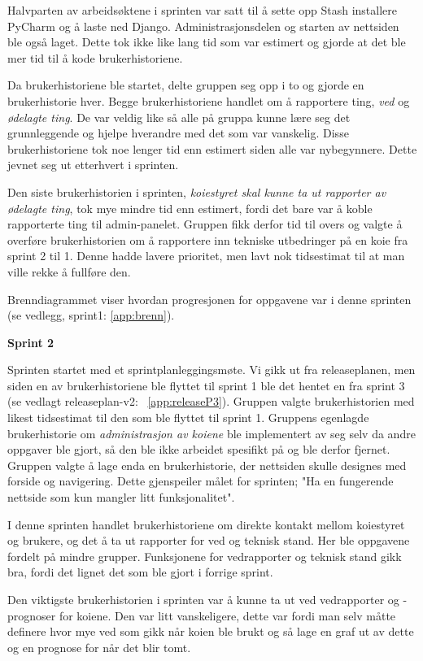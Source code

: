 \documentclass[12pt,a4paper,norsk]{article}
\begin{document}
Halvparten av arbeidsøktene i sprinten var satt til å sette opp Stash installere PyCharm og å laste ned Django. Administrasjonsdelen og starten av nettsiden ble også laget. Dette tok ikke like lang tid som var estimert og gjorde at det ble mer tid til å kode brukerhistoriene.

Da brukerhistoriene ble startet, delte gruppen seg opp i to og gjorde en brukerhistorie hver. Begge brukerhistoriene handlet om å rapportere ting, \textit{ved} og \textit{ødelagte ting}. De var veldig like så alle på gruppa kunne lære seg det grunnleggende og hjelpe hverandre med det som var vanskelig.  Disse brukerhistoriene tok noe lenger tid enn estimert siden alle var nybegynnere. Dette jevnet seg ut etterhvert i sprinten.

Den siste brukerhistorien i sprinten, \textit{koiestyret skal kunne ta ut rapporter av ødelagte ting}, tok mye mindre tid enn estimert, fordi det bare var å koble rapporterte ting til admin-panelet. Gruppen fikk derfor tid til overs og valgte å overføre brukerhistorien om å rapportere inn tekniske utbedringer på en koie fra sprint 2 til 1. Denne hadde lavere prioritet, men lavt nok tidsestimat til at man ville rekke å fullføre den.

Brenndiagrammet viser hvordan progresjonen for oppgavene var i denne sprinten (se vedlegg, sprint1: \cref{app:brenn}).

\bigskip \noindent \textbf{Sprint 2}
\par Sprinten startet med et sprintplanleggingsmøte. Vi gikk ut fra releaseplanen, men siden en av brukerhistoriene ble flyttet til sprint 1 ble det hentet en fra sprint 3 (se vedlagt releaseplan-v2: ~\cref{app:releaseP3}). Gruppen valgte brukerhistorien med likest tidsestimat til den som ble flyttet til sprint 1. Gruppens egenlagde brukerhistorie om \textit{administrasjon av koiene} ble implementert av seg selv da andre oppgaver ble gjort, så den ble ikke arbeidet spesifikt på og ble derfor fjernet. Gruppen valgte å lage enda en brukerhistorie, der nettsiden skulle designes med forside og navigering. Dette gjenspeiler målet for sprinten; "Ha en fungerende nettside som kun mangler litt funksjonalitet".

I denne sprinten handlet brukerhistoriene om direkte kontakt mellom koiestyret og brukere, og det å ta ut rapporter for ved og teknisk stand. Her ble oppgavene fordelt på mindre grupper. Funksjonene for vedrapporter og teknisk stand gikk bra, fordi det lignet det som ble gjort i forrige sprint.

Den viktigste brukerhistorien i sprinten var å kunne ta ut ved vedrapporter og -prognoser for koiene. Den var litt vanskeligere, dette var fordi man selv måtte definere hvor mye ved som gikk når koien ble brukt og så lage en graf ut av dette og en prognose for når det blir tomt.
\end{document}
